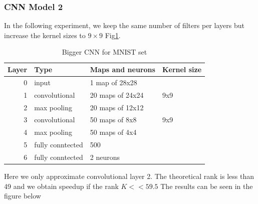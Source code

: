 \subsubsection{CNN Model 2}
In the following experiment, we keep the same number of filters per layers but increase the
kernel sizes to $9\times9$ Fig\ref{fig:CNN2}.

\begin{table}
\centering
\begin{tabular}{@{}rlll@{}}\toprule
Layer & Type & Maps and neurons& Kernel size \\ \midrule
0 & input & 1 map of 28x28 &\\
1& convolutional & 20 maps of 24x24 & 9x9\\
2 & max pooling & 20 maps of 12x12 &  \\
3 & convolutional & 50 maps of 8x8& 9x9 \\
4 & max pooling & 50 maps of 4x4&  \\ 
5 & fully conntected& 500 & \\
6 & fully conntected & 2 neurons & \\ \bottomrule
\end{tabular}
\caption{Bigger CNN for MNIST set}
\label{fig:CNN2}
\end{table}

Here we only approximate convolutional layer 2. The theoretical rank is less than 49 and we obtain speedup if the rank $K << 59.5$
The results can be seen in the figure below

